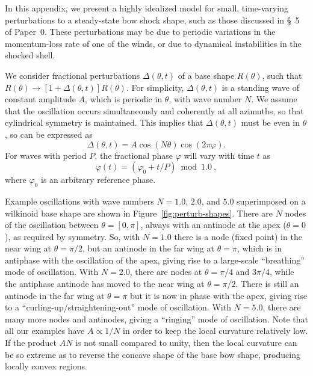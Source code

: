 In this appendix, we present a highly idealized model for small,
time-varying perturbations to a steady-state bow shock shape, such as
those discussed in \S~5 of Paper~0.  These perturbations may be due to
periodic variations in the momentum-loss rate of one of the winds, or
due to dynamical instabilities in the shocked shell.

We consider fractional perturbations \(\Delta(\theta, t)\) of a base shape
\(R(\theta)\), such that
\(R(\theta) \to [1 + \Delta(\theta, t)] R(\theta)\).  For simplicity,
\(\Delta(\theta, t)\) is a standing wave of constant amplitude \(A\), which is
periodic in \(\theta\), with wave number \(N\).  We assume that the
oscillation occurs simultaneously and coherently at all azimuths, so
that cylindrical symmetry is maintained.  This implies that
\(\Delta(\theta, t)\) must be even in \(\theta\), so can be expressed as
\begin{equation}
  \label{eq:standing-wave}
  \Delta(\theta, t) = A \cos(N \theta) \cos(2\pi \varphi) . 
\end{equation}
For waves with period \(P\), the fractional phase \(\varphi\) will
vary with time \(t\) as
\begin{equation}
  \label{eq:fractional-phase}
  \varphi(t) = (\varphi_0 + t/P) \bmod 1.0\ ,
\end{equation}
where \(\varphi_0\) is an arbitrary reference phase.

Example oscillations with wave numbers \(N = 1.0\), \(2.0\), and
\(5.0\) superimposed on a wilkinoid base shape are shown in
Figure~\ref{fig:perturb-shapes}.  There are \(N\) nodes of the
oscillation between \(\theta = [0, \pi]\), always with an antinode at the apex
(\(\theta = 0\)), as required by symmetry.  So, with \(N = 1.0\) there is a
node (fixed point) in the near wing at \(\theta = \pi/2\), but an antinode in
the far wing at \(\theta = \pi\), which is in antiphase with the oscillation
of the apex, giving rise to a large-scale ``breathing'' mode of
oscillation.  With \(N = 2.0\), there are nodes at \(\theta = \pi/4\) and
\(3\pi/4\), while the antiphase antinode has moved to the near wing at
\(\theta = \pi/2\).  There is still an antinode in the far wing at
\(\theta = \pi\) but it is now in phase with the apex, giving rise to a
``curling-up/straightening-out'' mode of oscillation.  With
\(N = 5.0\), there are many more nodes and antinodes, giving a
``ringing'' mode of oscillation.  Note that all our examples have
\(A \propto 1/N\) in order to keep the local curvature relatively low.  If
the product \(A N\) is not small compared to unity, then the local
curvature can be so extreme as to reverse the concave shape of the
base bow shape, producing locally convex regions.


